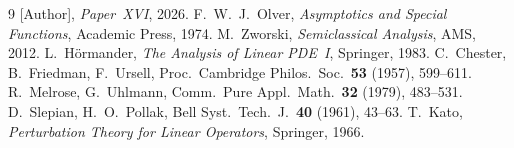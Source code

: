 \documentclass[12pt,a4paper]{amsart}
\theoremstyle{definition}
\theoremstyle{remark}
\begin{document}
\begin{thebibliography}{9}
[Author], \textit{Paper~XVI}, 2026.
F.~W.~J.~Olver, \textit{Asymptotics and Special Functions}, Academic Press, 1974.
M.~Zworski, \textit{Semiclassical Analysis}, AMS, 2012.
L.~H\"ormander, \textit{The Analysis of Linear PDE~I}, Springer, 1983.
C.~Chester, B.~Friedman, F.~Ursell, Proc.\ Cambridge Philos.\ Soc.\ \textbf{53} (1957), 599--611.
R.~Melrose, G.~Uhlmann, Comm.\ Pure Appl.\ Math.\ \textbf{32} (1979), 483--531.
D.~Slepian, H.~O.~Pollak, Bell Syst.\ Tech.\ J.\ \textbf{40} (1961), 43--63.
T.~Kato, \textit{Perturbation Theory for Linear Operators}, Springer, 1966.
\end{thebibliography}
\end{document}

